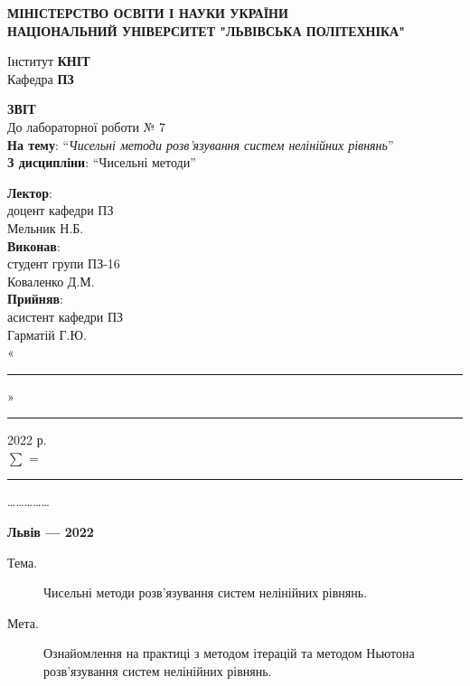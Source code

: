 \documentclass{article}
\newcommand\subject{Чисельні методи}
\newcommand\lecturer{доцент кафедри ПЗ\\Мельник Н.Б.}
\newcommand\teacher{асистент кафедри ПЗ\\Гарматій Г.Ю.}
\newcommand\mygroup{ПЗ-16}
\newcommand\lab{7}
\newcommand\theme{Чисельні методи розв’язування систем нелінійних рівнянь}
\newcommand\purpose{Ознайомлення на практиці з методом ітерацій та методом Ньютона розв’язування систем нелінійних рівнянь}
\begin{document}
	\begin{large}
		\begin{titlepage}
			\thispagestyle{empty}
			\begin{center}
				\textbf{МІНІСТЕРСТВО ОСВІТИ І НАУКИ УКРАЇНИ\\
					НАЦІОНАЛЬНИЙ УНІВЕРСИТЕТ "ЛЬВІВСЬКА ПОЛІТЕХНІКА"}
			\end{center}
			\begin{flushright}
				Інститут \textbf{КНІТ}\\
				Кафедра \textbf{ПЗ}
			\end{flushright}
			\vspace{200pt}
			\begin{center}
				\textbf{ЗВІТ}\\
				\vspace{10pt}
				До лабораторної роботи № \lab\\
				\textbf{На тему}: “\textit{\theme}”\\
				\textbf{З дисципліни}: “\subject”
			\end{center}
			\vspace{90pt}
			\begin{flushright}
				
				\textbf{Лектор}:\\
				\lecturer\\
				\vspace{28pt}
				\textbf{Виконав}:\\
				
				студент групи \mygroup\\
				Коваленко Д.М.\\
				\vspace{28pt}
				\textbf{Прийняв}:\\
				
				\teacher\\
				
				\vspace{28pt}
				«\rule{1cm}{0.15mm}» \rule{1.5cm}{0.15mm} 2022 р.\\
				$\sum$ = \rule{1cm}{0.15mm}……………\\
				
			\end{flushright}
			\vspace{\fill}
			\begin{center}
				\textbf{Львів — 2022}
			\end{center}
		\end{titlepage}
		
		\begin{description}
			\item[Тема.] \theme.
			\item[Мета.] \purpose.
		\end{description}
		

\end{large}
\end{document}
